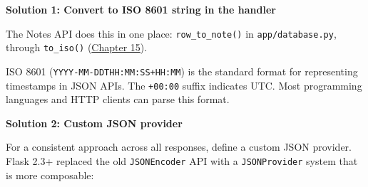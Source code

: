 \begin{codebox}[short]

\begin{Shaded}
\begin{Highlighting}[]
\NormalTok{: row[}\NormalTok{]\}), }
\end{Highlighting}
\end{Shaded}

\end{codebox}

\noindent{}\textbf{Solution 1: Convert to ISO 8601 string in the handler}

\begin{codebox}[short]

\begin{Shaded}
\begin{Highlighting}[]
    \NormalTok{: row[}\NormalTok{].isoformat(),}
\NormalTok{\}), }
\end{Highlighting}
\end{Shaded}

\end{codebox}

\noindent{}The Notes API does this in one place: \texttt{row\_to\_note()} in \texttt{app/database.py}, through \texttt{to\_iso()} (\hyperref[ch:15-structuring-the-application]{Chapter 15}).

ISO 8601 (\texttt{YYYY-}\allowbreak{}\texttt{MM-}\allowbreak{}\texttt{DDTHH:}\allowbreak{}\texttt{MM:}\allowbreak{}\texttt{SS+HH:}\allowbreak{}\texttt{MM}) is the standard format for representing timestamps in JSON APIs. The \texttt{+00:00} suffix indicates UTC. Most programming languages and HTTP clients can parse this format.

\textbf{Solution 2: Custom JSON provider}

For a consistent approach across all responses, define a custom JSON provider. Flask 2.3+ replaced the old \texttt{JSONEncoder} API with a \texttt{JSONProvider} system that is more composable:


